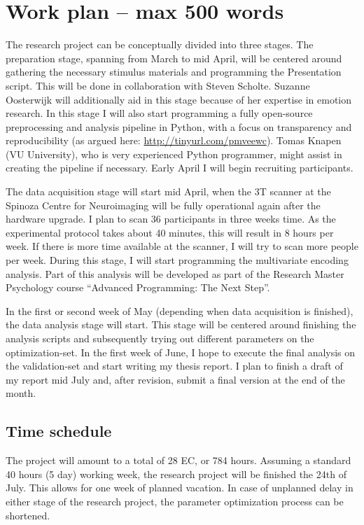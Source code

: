 \documentclass[12pt,a4paper]{article}\usepackage[]{graphicx}\usepackage[]{color}
\begin{document}
\noindent
\wordcount

\section{Work plan \textmd{– max 500 words}}
The research project can be conceptually divided into three stages. The preparation stage, spanning from March to mid April, will be centered around gathering the necessary stimulus materials and programming the Presentation script. This will be done in collaboration with Steven Scholte. Suzanne Oosterwijk will additionally aid in this stage because of her expertise in emotion research. In this stage I will also start programming a fully open-source preprocessing and analysis pipeline in Python, with a focus on transparency and reproducibility (as argued here: \url{http://tinyurl.com/pmveewc}). Tomas Knapen (VU University), who is very experienced Python programmer, might assist in creating the pipeline if necessary. Early April I will begin recruiting participants. 

The data acquisition stage will start mid April, when the 3T scanner at the Spinoza Centre for Neuroimaging will be fully operational again after the hardware upgrade. I plan to scan 36 participants in three weeks time. As the experimental protocol takes about 40 minutes, this will result in 8 hours per week. If there is more time available at the scanner, I will try to scan more people per week. During this stage, I will start programming the multivariate encoding analysis. Part of this analysis will be developed as part of the Research Master Psychology course ``Advanced Programming: The Next Step''.

In the first or second week of May (depending when data acquisition is finished), the data analysis stage will start. This stage will be centered around finishing the analysis scripts and subsequently trying out different parameters on the optimization-set. In the first week of June, I hope to execute the final analysis on the validation-set and start writing my thesis report. I plan to finish a draft of my report mid July and, after revision, submit a final version at the end of the month.

\subsection{Time schedule}
The project will amount to a total of 28 EC, or  784 hours. Assuming a standard 40 hours (5 day) working week, the research project will be finished the 24th of July. This allows for one week of planned vacation. In case of unplanned delay in either stage of the research project, the parameter optimization process can be shortened. 
\end{document}
